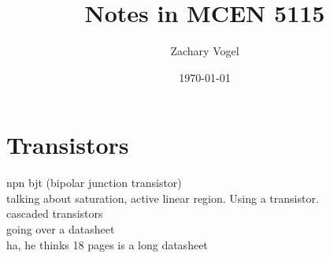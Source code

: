 \documentclass{article}
\author{Zachary Vogel}
\date{\today}
\title{Notes in MCEN 5115}
\begin{document}
\maketitle


\section*{Transistors}
npn bjt (bipolar junction transistor)\\
talking about saturation, active linear region. Using a transistor.\\
cascaded transistors\\
going over a datasheet\\
ha, he thinks 18 pages is a long datasheet
\end{document}
